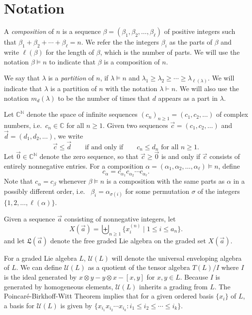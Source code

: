 \documentclass[11pt]{amsart}
\newcommand{\defncolor}{\color{darkred}}
\newcommand{\defn}[1]{{\defncolor\emph{#1}}} %
\theoremstyle{definition}
\numberwithin{equation}{section}
\def\NN{{\mathbb N}}
\def\CC{{\mathbb C}}
\begin{document}
\section{Notation}

A \defn{composition} of $n$ is a sequence $\beta = (\beta_1, \beta_2, \ldots, \beta_\ell)$ of positive integers such that $\beta_{1} + \beta_{2} + \cdots + \beta_{\ell} = n$.  
We refer the the integers $\beta_{i}$ as the parts of $\beta$ and write $\ell(\beta)$ for the length of $\beta$, which is the number of parts.  
We will use the notation $\beta \vDash n$ to indicate that $\beta$ is a composition of $n$.

We say that $\lambda$ is a \defn{partition} of $n$, if $\lambda \vDash n$ and
$\lambda_1 \geq \lambda_2 \geq \cdots \geq \lambda_{\ell(\lambda)}$.  We will indicate that $\lambda$ is a partition
of $n$ with the notation $\lambda \vdash n$.  We will also use the notation $m_d(\lambda)$ to be the number of times
that $d$ appears as a part in $\lambda$.

Let $\CC^{\NN}$ denote the space of infinite sequences $(c_{n})_{n \ge 1} = (c_{1}, c_{2}, \ldots)$ of complex numbers, i.e.~$c_{n} \in \CC$ for all $n \ge 1$.  
Given two sequences $\vec{c} = (c_{1}, c_{2}, \ldots)$ and $\vec{d} = (d_{1}, d_{2}, \ldots)$, we write
\[
\vec{c} \le \vec{d} 
\qquad\text{if and only if}\qquad
\text{$c_{n} \le d_{n}$ for all $n \ge 1$}.
\]
Let $\vec{0} \in \CC^{\NN}$ denote the zero sequence, so that $\vec{c} \ge \vec{0}$ is and only if $\vec{c}$ consists of entirely nonnegative entries.  
For a composition $\alpha = (\alpha_{1}, \alpha_{2}, \ldots, \alpha_{\ell}) \vDash n$, define 
\[
c_{\alpha} = c_{\alpha_{1}} c_{\alpha_{2}} \cdots c_{\alpha_{\ell}}.
\]
Note that $c_{\alpha} = c_{\beta}$ whenever $\beta \vDash n$ is a composition with the same parts as $\alpha$ in a possibly different order, i.e.~ $\beta_{i} = \alpha_{\sigma(i)}$ for some permutation $\sigma$ of the integers $\{1,2, \ldots, \ell(\alpha)\}$.


Given a sequence $\vec{a}$ consisting of nonnegative integers, let 
\[
X(\vec{a}) = \biguplus_{n \ge 1} \{x^{(n)}_{i} \;|\; 1 \le i \le a_{n} \}.
\]
and let $\mathfrak{L}(\vec{a})$ denote the free graded Lie algebra on the graded set $X(\vec{a})$.  

For a graded Lie algebra $L$, $\mathcal{U}(L)$ will denote the universal enveloping algebra of $L$. We can define $\mathcal{U}(L)$ as a quotient of the tensor algebra $T(L)/I$ where $I$ is the ideal generated by $x \otimes y - y \otimes x - [x,y]$ for $x,y \in L$. Because $I$ is generated by homogeneous elements, $\mathcal{U}(L)$ inherits a grading from $L$. The Poincar\'{e}-Birkhoff-Witt Theorem implies that for a given ordered basis $\{x_i\}$ of $L$, a basis for $\mathcal{U}(L)$ is given by $\{x_{i_1}x_{i_2}\cdots x_{i_k}:i_1 \leq i_2 \leq \cdots \leq i_k\}.$
\end{document}
